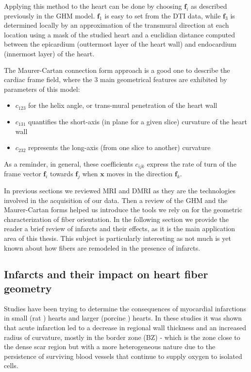 Applying this method to the heart can be done by choosing $\mathbf{f}_i$ as described previously in the GHM model. $\mathbf{f}_1$ is easy to set from the DTI data, while $\mathbf{f}_3$ is determined locally by an approximation of the transmural direction at each location using a mask of the studied heart and a euclidian distance computed between the epicardium (outtermost layer of the heart wall) and endocardium (innermost layer) of the heart.

The Maurer-Cartan connection form approach is a good one to describe the cardiac frame field, where the 3 main geometrical features are exhibited by parameters of this model:
\begin{itemize}
    \item $c_{123}$ for the helix angle, or trans-mural penetration of the heart wall
    \item $c_{131}$ quantifies the short-axis (in plane for a given slice) curvature of the heart wall
    \item $c_{232}$ represents the long-axis (from one slice to another) curvature
\end{itemize}
As a reminder, in general, these coefficients $c_{ijk}$ express the rate of turn of the frame vector $\mathbf{f}_i$ towards $\mathbf{f}_j$ when $\mathbf{x}$ moves in the direction $\mathbf{f}_k$.

In previous sections we reviewed MRI and DMRI as they are the technologies involved in the acquisition of our data. Then a review of the GHM and the Maurer-Cartan forms helped us introduce the tools we rely on for the geometric characterization of fiber orientation. In the following section we provide the reader a brief review of infarcts and their effects, as it is the main application area of this thesis. This subject is particularly interesting as not much is yet known about how fibers are remodeled in the presence of infarcts.

\subsection{Infarcts and their impact on heart fiber geometry}

Studies have been trying to determine the consequences of myocardial infarctions in small (rat \cite{weisman1985global}) hearts and larger (porcine \cite{wu2007mr, mediamihaela}) hearts. In these studies it was shown that acute infarction led to a decrease in regional wall thickness and an increased radius of curvature, mostly in the border zone (BZ) - which is the zone close to the dense scar region but with a more heterogeneous nature due to the persistence of surviving blood vessels that continue to supply oxygen to isolated cells.

